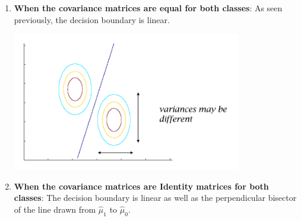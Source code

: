 \documentclass[
]{article}
\providecommand{\tightlist}{%
  \setlength{\itemsep}{0pt}\setlength{\parskip}{0pt}}
\begin{document}
\begin{enumerate}
\def\labelenumi{\arabic{enumi}.}
\tightlist
\item
  \textbf{When the covariance matrices are equal for both classes}: As
  seen previously, the decision boundary is linear.

\includegraphics[width=10cm]{./images/equal_var.png} 

\item 
    \textbf{When the covariance
matrices are Identity matrices for both classes}: The decision boundary
is linear as well as the perpendicular bisector of the line drawn from
\(\hat{\mu}_1\) to \(\hat{\mu}_0\).


\end{enumerate}
\end{document}
